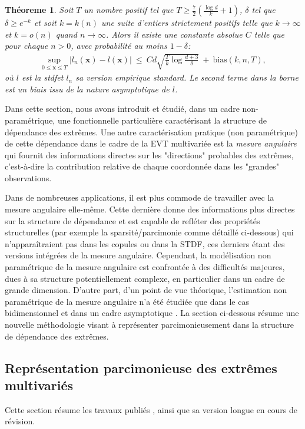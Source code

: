 \documentclass[a4paper, 12pt]{article}
\newtheorem{theoreme}{Théoreme}
\def\stdf{{\sc stdf}}
\begin{document}
\begin{theoreme}
\label{resume_fr:thm:l}
Soit $T$ un nombre positif tel que $T \ge \frac{7}{2}(\frac{\log d}{k} + 1)$, $\delta$ tel que $\delta \ge e^{-k}$ et soit $k=k(n)$ une suite d'entiers strictement positifs telle que $k \to \infty$ et $k=o(n)$ quand $n \to \infty$. 
Alors il existe une constante absolue $ C $ telle que pour chaque $ n> 0 $, avec probabilité au moins $ 1- \delta $:
\begin{align*}
\sup_{0 \le \mathbf{x} \le T} \left| l_n(\mathbf{x}) - l(\mathbf{x}) \right| ~\le~ Cd\sqrt{\frac{T}{k}\log\frac{d+3}{\delta}} ~+~
\text{bias}(k, n, T),
\end{align*}
où $ l $ est la \stdf et $ l_n $ sa version empirique standard. Le second terme dans la borne est un biais issu de la nature asymptotique de $ l $.
\end{theoreme}


Dans cette section, nous avons introduit et étudié, dans un cadre non-paramétrique, une fonctionnelle particulière caractérisant la structure de dépendance des extrêmes.
%
Une autre caractérisation pratique (non paramétrique) de cette dépendance dans le cadre de la EVT multivariée est la \textit{mesure angulaire} qui fournit des informations directes sur les "directions" probables des extrêmes, c'est-à-dire la contribution relative de chaque coordonnée dans les "grandes" observations.

Dans de nombreuses applications, il est plus commode de travailler avec la mesure angulaire elle-même. Cette dernière donne des informations plus directes sur la structure de dépendance et est capable de refléter des propriétés structurelles (par exemple la sparsité/parcimonie comme détaillé ci-dessous) qui n'apparaîtraient pas dans les copules ou dans la STDF, ces derniers étant des versions intégrées de la mesure angulaire.
Cependant, la modélisation non paramétrique de la mesure angulaire est confrontée à des difficultés majeures, dues à sa structure potentiellement complexe, en particulier dans un cadre de grande dimension.
D'autre part, d'un point de vue théorique, l'estimation non paramétrique de la mesure angulaire n'a été étudiée que dans le cas bidimensionnel et dans un cadre asymptotique \cite{Einmahl2001, Einmahl2009}. La section ci-dessous résume une nouvelle méthodologie visant à représenter parcimonieusement dans la structure de dépendance des extrêmes.


\subsection{Représentation parcimonieuse des extrêmes multivariés}
\label{resume_fr:sec:JMVA}
Cette section résume les travaux publiés \cite{AISTAT16}, ainsi que sa version longue \cite{ARXIV16} en cours de révision.
\end{document}
